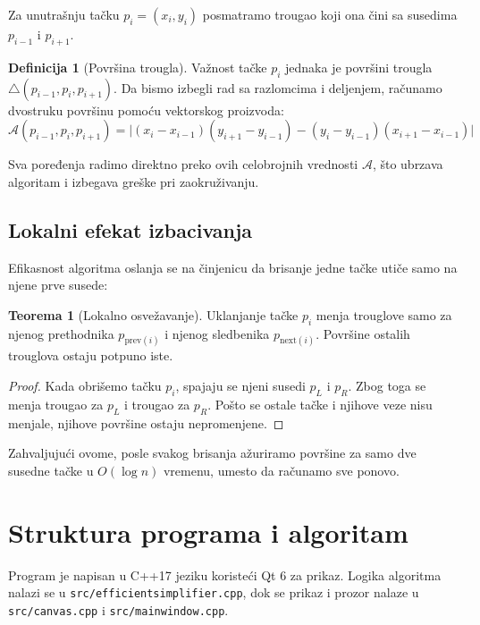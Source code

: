 \documentclass[11pt]{article}
\theoremstyle{definition}
\newtheorem{definition}{Definicija}[section]
\newtheorem{theorem}{Teorema}[section]
\begin{document}
Za unutrašnju tačku $p_i = (x_i, y_i)$ posmatramo trougao koji ona čini sa susedima $p_{i-1}$ i $p_{i+1}$.

\begin{definition}[Površina trougla]
\label{def:povrsina}
Važnost tačke $p_i$ jednaka je površini trougla $\triangle(p_{i-1}, p_i, p_{i+1})$. Da bismo izbegli rad sa razlomcima i deljenjem, računamo dvostruku površinu pomoću vektorskog proizvoda:
\[
\mathcal{A}(p_{i-1}, p_i, p_{i+1}) = \big| (x_i - x_{i-1})(y_{i+1} - y_{i-1}) - (y_i - y_{i-1})(x_{i+1} - x_{i-1}) \big|
\]
\end{definition}

Sva poređenja radimo direktno preko ovih celobrojnih vrednosti $\mathcal{A}$, što ubrzava algoritam i izbegava greške pri zaokruživanju.

\subsection{Lokalni efekat izbacivanja}

Efikasnost algoritma oslanja se na činjenicu da brisanje jedne tačke utiče samo na njene prve susede:

\begin{theorem}[Lokalno osvežavanje]
\label{thr:lokalnost}
Uklanjanje tačke $p_i$ menja trouglove samo za njenog prethodnika $p_{\text{prev}(i)}$ i njenog sledbenika $p_{\text{next}(i)}$. Površine ostalih trouglova ostaju potpuno iste.
\end{theorem}

\begin{proof}
Kada obrišemo tačku $p_i$, spajaju se njeni susedi $p_L$ i $p_R$. Zbog toga se menja trougao za $p_L$ i trougao za $p_R$. Pošto se ostale tačke i njihove veze nisu menjale, njihove površine ostaju nepromenjene.
\end{proof}

Zahvaljujući ovome, posle svakog brisanja ažuriramo površine za samo dve susedne tačke u $O(\log n)$ vremenu, umesto da računamo sve ponovo.

\section{Struktura programa i algoritam}

Program je napisan u C++17 jeziku koristeći Qt 6 za prikaz. Logika algoritma nalazi se u \texttt{src/efficientsimplifier.cpp}, dok se prikaz i prozor nalaze u \texttt{src/canvas.cpp} i \texttt{src/mainwindow.cpp}.
\end{document}
